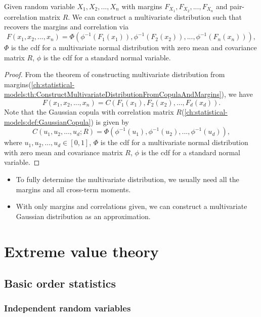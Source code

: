 \begin{refsection}
\begin{theorem}
Given random variable $X_1,X_2,...,X_n$ with margins $F_{X_1},F_{X_2},...,F_{X_n}$ and pair-correlation matrix $R$. We can construct a multivariate distribution such that recovers the margins and correlation via
$$F(x_1,x_2,...,x_n) = \Phi(\phi^{-1}(F_1(x_1)),\phi^{-1}(F_2(x_2)),...,\phi^{-1}(F_n(x_n))),$$
$\Phi$ is the cdf for a multivariate normal distribution with zero mean and covariance matrix $R$, $\phi$ is the cdf for a standard normal variable.	
\end{theorem}
\begin{proof}
From the theorem of constructing multivariate distribution from margins(\autoref{ch:statistical-models:th:ConstructMultivariateDistributionFromCopulaAndMargins}), we have
	$$F(x_1,x_2,...,x_n) = C(F_1(x_1),F_2(x_2),...,F_d(x_d)).$$
Note that the Gaussian copula with correlation matrix $R$(\autoref{ch:statistical-models:def:GaussianCopula}) is given by
	$$C(u_1,u_2,...,u_d; R) = \Phi(\phi^{-1}(u_1),\phi^{-1}(u_2),...,\phi^{-1}(u_d)),$$
	where $u_1,u_2,...,u_d \in [0,1]$, $\Phi$ is the cdf for a multivariate normal distribution with zero mean and covariance matrix $R$, $\phi$ is the cdf for a standard normal variable. 
\end{proof}

\begin{remark}[implications]\hfill
\begin{itemize}
	\item To fully determine the multivariate distribution, we usually need all the margins and all cross-term moments. 
	\item With only margins and correlations given, we can construct a multivariate Gaussian distribution as an approximation.  
\end{itemize}	
	
\end{remark}



\section{Extreme value theory}
\subsection{Basic order statistics}
\subsubsection{Independent random variables}



\end{refsection}
